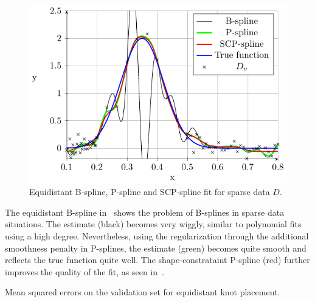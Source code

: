 \begin{figure}[H]
	\centering
	\includegraphics{graphics/pgfplots/cha4/exp-sparse-equidistant.pdf}
	\caption{Equidistant B-spline, P-spline and SCP-spline fit for sparse data $D$.}
	\label{fig:sparse-example-equidistant}
\end{figure}

The equidistant B-spline in~ shows the problem of B-splines in sparse data situations. The estimate (black) becomes very wiggly, similar to polynomial fits using a high degree. Nevertheless, using the regularization through the additional smoothness penalty in P-splines, the estimate (green) becomes quite smooth and reflects the true function quite well. The shape-constrataint P-spline (red) further improves the quality of the fit, as seen in~. 

\begin{table}[H]
	\begin{center}
	\end{center}
	\caption{Mean squared errors on the validation set for equidistant knot placement.}
	\label{tab:sparse-example-equidistant}
\end{table}



